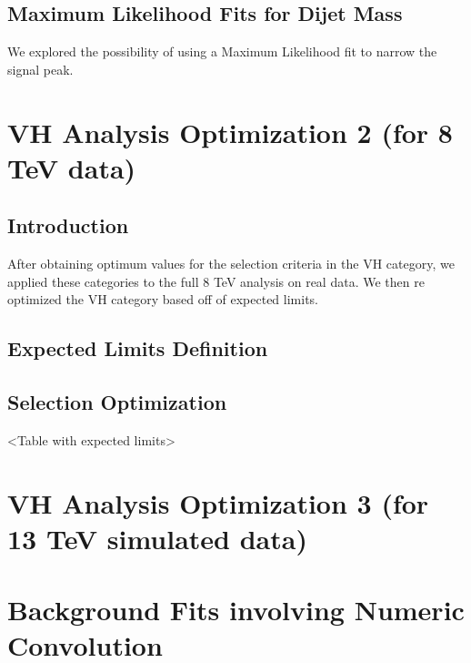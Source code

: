 \documentclass[12pt]{article}
\begin{document}
\subsection{Maximum Likelihood Fits for Dijet Mass}
We explored the possibility of using a Maximum Likelihood fit to narrow the signal peak.
\section{VH Analysis Optimization 2 (for 8 TeV data)}
\subsection{Introduction}
After obtaining optimum values for the selection criteria in the VH category, we applied these categories to the full 8 TeV analysis on real data. We then re optimized the VH category based off of expected limits. 
\subsection{Expected Limits Definition}
\subsection{Selection Optimization}
<Table with expected limits>
\section{VH Analysis Optimization 3 (for 13 TeV simulated data)}
\section{Background Fits involving Numeric Convolution}
\end{document}
